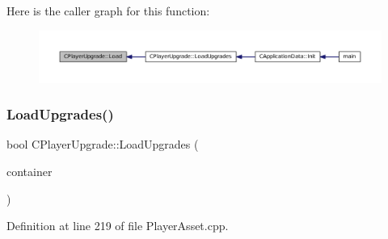 Here is the caller graph for this function\+:\nopagebreak
\begin{figure}[H]
\begin{center}
\leavevmode
\includegraphics[width=350pt]{classCPlayerUpgrade_a685fab69765ef63952cdbcaa6b1b927b_icgraph}
\end{center}
\end{figure}
\hypertarget{classCPlayerUpgrade_a9bef3d3f2866cd555a9b175426e953d6}{}\label{classCPlayerUpgrade_a9bef3d3f2866cd555a9b175426e953d6} 
\subsubsection{\texorpdfstring{Load\+Upgrades()}{LoadUpgrades()}}
{\footnotesize\ttfamily bool C\+Player\+Upgrade\+::\+Load\+Upgrades (\begin{DoxyParamCaption}\item[{std\+::shared\+\_\+ptr$<$ \hyperlink{classCDataSourceContainer}{C\+Data\+Source\+Container} $>$}]{container }\end{DoxyParamCaption})\hspace{0.3cm}{\ttfamily [static]}}



Definition at line 219 of file Player\+Asset.\+cpp.


